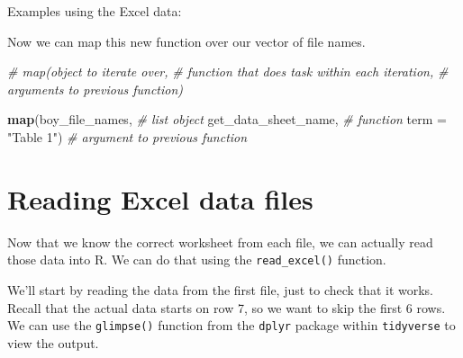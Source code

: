\documentclass[
]{book}
\newenvironment{Shaded}{\begin{snugshade}}{\end{snugshade}}
\newcommand{\CommentTok}[1]{\textcolor[rgb]{0.56,0.35,0.01}{\textit{#1}}}
\newcommand{\ControlFlowTok}[1]{\textcolor[rgb]{0.13,0.29,0.53}{\textbf{#1}}}
\newcommand{\DataTypeTok}[1]{\textcolor[rgb]{0.13,0.29,0.53}{#1}}
\newcommand{\DecValTok}[1]{\textcolor[rgb]{0.00,0.00,0.81}{#1}}
\newcommand{\KeywordTok}[1]{\textcolor[rgb]{0.13,0.29,0.53}{\textbf{#1}}}
\newcommand{\NormalTok}[1]{#1}
\newcommand{\OperatorTok}[1]{\textcolor[rgb]{0.81,0.36,0.00}{\textbf{#1}}}
\newcommand{\StringTok}[1]{\textcolor[rgb]{0.31,0.60,0.02}{#1}}
\begin{document}
Examples using the Excel data:

\begin{Shaded}
\end{Shaded}

Now we can map this new function over our vector of file names.

\begin{Shaded}
\begin{Highlighting}[]
\CommentTok{# map(object to iterate over, }
\CommentTok{#     function that does task within each iteration, }
\CommentTok{#     arguments to previous function)}
 
\KeywordTok{map}\NormalTok{(boy_file_names,      }\CommentTok{# list object}
\NormalTok{    get_data_sheet_name, }\CommentTok{# function}
    \DataTypeTok{term =} \StringTok{"Table 1"}\NormalTok{)    }\CommentTok{# argument to previous function}
\end{Highlighting}
\end{Shaded}

\hypertarget{reading-excel-data-files}{%
\section{Reading Excel data files}\label{reading-excel-data-files}}

Now that we know the correct worksheet from each file, we can actually
read those data into R. We can do that using the \texttt{read\_excel()} function.

We'll start by reading the data from the first file, just to check
that it works. Recall that the actual data starts on row 7, so we want
to skip the first 6 rows. We can use the \texttt{glimpse()} function from
the \texttt{dplyr} package within \texttt{tidyverse} to view the output.
\end{document}
